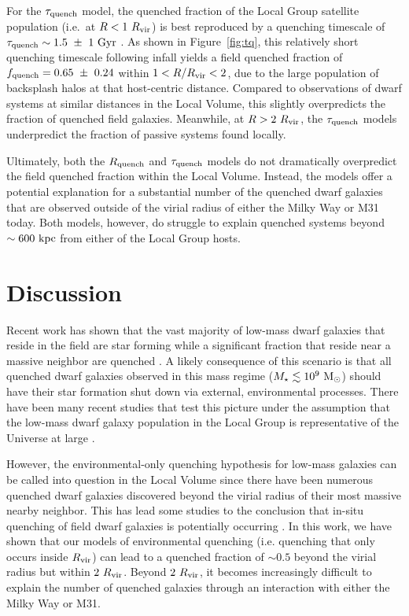 \documentclass[usenatbib]{mnras}
\newcommand{\rvir}{R_{\rm vir}}
\newcommand{\mstar}{{M}_{\star}}
\newcommand{\msun}{{\rm M}_{\odot}}
\begin{document}
For the $\tau_{\rm quench}$ model, the quenched fraction of the Local Group
satellite population (i.e.~at $R < 1~\rvir$) is best reproduced by a quenching
timescale of $\tau_{\rm quench} \sim 1.5~\pm~1~{\rm Gyr}$ \citep{fham15}. As
shown in Figure~\ref{fig:tq}, this relatively short quenching timescale
following infall yields a field quenched fraction of
$f_{\rm quench}=0.65~\pm~0.24$ within $1 < R/\rvir < 2$, due to the large
population of backsplash halos at that host-centric distance.
%
Compared to observations of dwarf systems at similar distances in the Local
Volume, this slightly overpredicts the fraction of quenched field galaxies.
%
Meanwhile, at $R > 2~\rvir$, the $\tau_{\rm quench}$ models underpredict the
fraction of passive systems found locally.
%


Ultimately, both the $R_{\rm quench}$ and $\tau_{\rm quench}$ models do not
dramatically overpredict the field quenched fraction within the Local
Volume. Instead, the models offer a potential explanation for a substantial
number of the quenched dwarf galaxies that are observed outside of the virial
radius of either the Milky Way or M31 today. Both models, however, do struggle
to explain quenched systems beyond $\sim600~{\rm kpc}$ from either of the Local
Group hosts.
%




\section{Discussion}
\label{sec:disc}

Recent work has shown that the vast majority of low-mass dwarf galaxies that
reside in the field are star forming while a significant fraction that reside
near a massive neighbor are quenched \citep[e.g.][]{geha12}.
%
A likely consequence of this scenario is that all quenched dwarf galaxies
observed in this mass regime ($\mstar\lesssim10^{9}~\msun$) should have their
star formation shut down via external, environmental processes.
%
There have been many recent studies that test this picture under the assumption
that the low-mass dwarf galaxy population in the Local Group is representative
of the Universe at large \citep[e.g.][]{wheeler14, slater14, weisz15, wetzel15b,
  fham15, fham16}.
%

However, the environmental-only quenching hypothesis for low-mass galaxies can
be called into question in the Local Volume since there have been numerous
quenched dwarf galaxies discovered beyond the virial radius of their most
massive nearby neighbor.
%
This has lead some studies to the conclusion that in-situ quenching of field
dwarf galaxies is potentially occurring \citep{makarova17}.
%
In this work, we have shown that our models of environmental quenching
(i.e. quenching that only occurs inside $R_{\rm vir}$) can lead to a quenched
fraction of $\sim0.5$ beyond the virial radius but within $2~\rvir$.
%
Beyond $2~\rvir$, it becomes increasingly difficult to explain the
number of quenched galaxies through an interaction with either the
Milky Way or M31.
%
\end{document}
